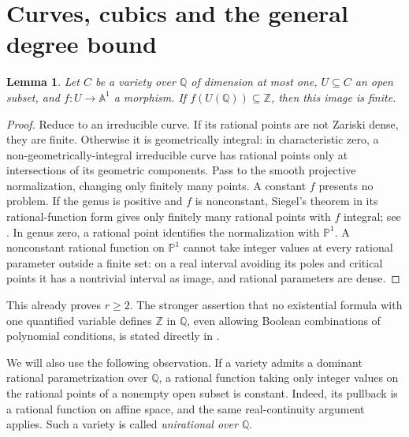\documentclass[11pt]{article}
\newtheorem{lemma}[theorem]{Lemma}
\theoremstyle{remark}\newtheorem{remark}[theorem]{Remark}
\newcommand{\Q}{\mathbb Q}\newcommand{\Z}{\mathbb Z}\newcommand{\R}{\mathbb R}
\newcommand{\A}{\mathbb A}\newcommand{\PP}{\mathbb P}\newcommand{\Gm}{\mathbb G_m}
\begin{document}
\section{Curves, cubics and the general degree bound}

\begin{lemma}\label{curve}
Let \(C\) be a variety over \(\Q\) of dimension at most one, \(U\subseteq C\) an open subset, and \(f:U\to\A^1\) a morphism. If \(f(U(\Q))\subseteq\Z\), then this image is finite.
\end{lemma}
\begin{proof}
Reduce to an irreducible curve. If its rational points are not Zariski dense, they are finite. Otherwise it is geometrically integral: in characteristic zero, a non-geometrically-integral irreducible curve has rational points only at intersections of its geometric components. Pass to the smooth projective normalization, changing only finitely many points. A constant \(f\) presents no problem. If the genus is positive and \(f\) is nonconstant, Siegel's theorem in its rational-function form gives only finitely many rational points with \(f\) integral; see \cite[Theorem 1.1]{Levin}. In genus zero, a rational point identifies the normalization with \(\PP^1\). A nonconstant rational function on \(\PP^1\) cannot take integer values at every rational parameter outside a finite set: on a real interval avoiding its poles and critical points it has a nontrivial interval as image, and rational parameters are dense.
\end{proof}

This already proves \(r\ge2\). The stronger assertion that no existential formula with one quantified variable defines \(\Z\) in \(\Q\), even allowing Boolean combinations of polynomial conditions, is stated directly in \cite[Remark 8.8]{DDF}.

We will also use the following observation. If a variety admits a dominant rational parametrization over \(\Q\), a rational function taking only integer values on the rational points of a nonempty open subset is constant. Indeed, its pullback is a rational function on affine space, and the same real-continuity argument applies. Such a variety is called \emph{unirational over \(\Q\)}.
\end{document}
